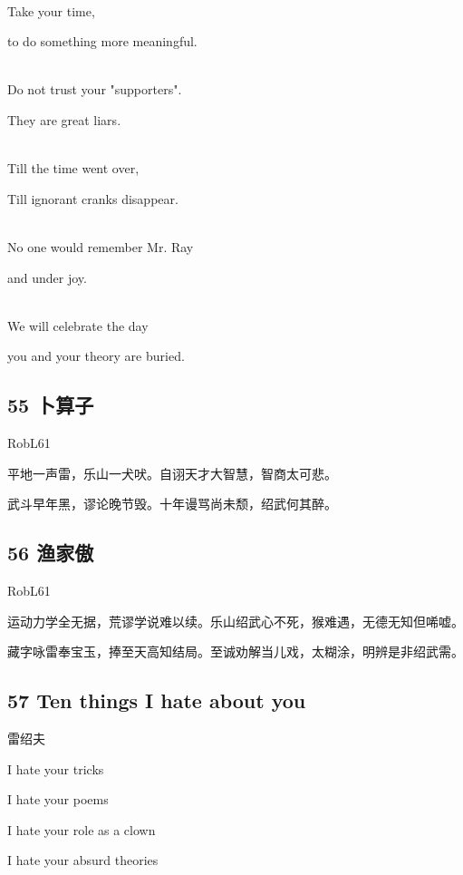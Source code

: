 ~\\
Take your time,

to do something more meaningful.

~\\
Do not trust your "supporters".

They are great liars.

~\\
Till the time went over,

Till ignorant cranks disappear.

~\\
No one would remember Mr. Ray

and under joy.

~\\
We will celebrate the day

you and your theory are buried.

\hypertarget{ux535cux7b97ux5b50}{%
\subsection{55 卜算子}\label{ux535cux7b97ux5b50}}

RobL61

平地一声雷，乐山一犬吠。自诩天才大智慧，智商太可悲。

武斗早年黑，谬论晚节毁。十年谩骂尚未颓，绍武何其醉。

\hypertarget{ux6e14ux5bb6ux50b2}{%
\subsection{56 渔家傲}\label{ux6e14ux5bb6ux50b2}}

RobL61

运动力学全无据，荒谬学说难以续。乐山绍武心不死，猴难遇，无德无知但唏嘘。

藏字咏雷奉宝玉，捧至天高知结局。至诚劝解当儿戏，太糊涂，明辨是非绍武需。

\hypertarget{ten-things-i-hate-about-you}{%
\subsection{57 Ten things I hate about
you}\label{ten-things-i-hate-about-you}}

雷绍夫

I hate your tricks

I hate your poems

I hate your role as a clown

I hate your absurd theories

